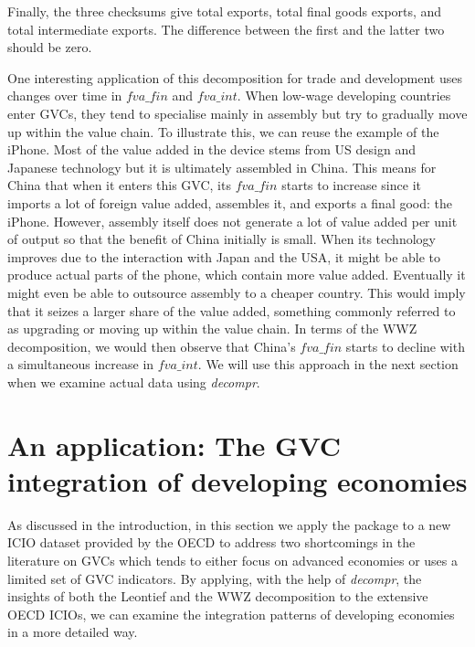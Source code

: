\documentclass[a4paper,11pt]{article}
\begin{document}
Finally, the three checksums give total exports, total final goods exports, and total intermediate exports. The difference between the first and the latter two should be zero.

One interesting application of this decomposition for trade and development uses changes over time in $fva\_fin$ and $fva\_int$. When low-wage developing countries enter GVCs, they tend to specialise mainly in assembly but try to gradually move up within the value chain.    
To illustrate this, we can reuse the example of the iPhone. Most of the value added in the device stems from US design and Japanese technology but it is ultimately assembled in China. This means for China that when it enters this GVC, its $fva\_fin$ starts to increase since it imports a lot of foreign value added, assembles it, and exports a final good: the iPhone. However, assembly itself does not generate a lot of value added per unit of output so that the benefit of China initially is small. 
When its technology improves due to the interaction with Japan and the USA, it might be able to produce actual parts of the phone, which contain more value added. Eventually it might even be able to outsource assembly to a cheaper country. This would imply that it seizes a larger share of the value added, something commonly referred to as upgrading or moving up within the value chain. In terms of the WWZ decomposition, we would then observe that China's $fva\_fin$ starts to decline with a simultaneous increase in $fva\_int$. We will use this approach in the next section when we examine actual data using \textit{decompr}.

\section{An application: The GVC integration of developing economies}
\label{sec:application}

As discussed in the introduction, in this section we apply the package to a new ICIO dataset provided by the OECD to address two shortcomings in the literature on GVCs which tends to either focus on advanced economies or uses a limited set of GVC indicators. By applying, with the help of \textit{decompr}, the insights of both the Leontief and the WWZ decomposition to the extensive OECD ICIOs, we can examine the integration patterns of developing economies in a more detailed way.
\end{document}
